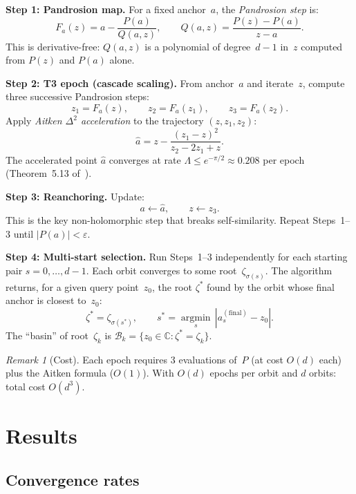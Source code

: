 \documentclass[11pt,a4paper]{article}
\theoremstyle{definition}
\theoremstyle{remark}
\newtheorem{remark}[theorem]{Remark}
\begin{document}
\medskip
\noindent\textbf{Step 1: Pandrosion map.}  For a fixed anchor~$a$, the \emph{Pandrosion step} is:
\[
  F_a(z) = a - \frac{P(a)}{Q(a, z)}, \qquad
  Q(a, z) = \frac{P(z) - P(a)}{z - a}.
\]
This is derivative-free: $Q(a, z)$ is a polynomial of degree~$d-1$ in~$z$ computed from $P(z)$ and $P(a)$ alone.

\medskip
\noindent\textbf{Step 2: T3 epoch (cascade scaling).}  From anchor~$a$ and iterate~$z$, compute three successive Pandrosion steps:
\[
  z_1 = F_a(z), \qquad z_2 = F_a(z_1), \qquad z_3 = F_a(z_2).
\]
Apply \emph{Aitken $\Delta^2$ acceleration} to the trajectory $(z, z_1, z_2)$:
\[
  \hat{a} = z - \frac{(z_1 - z)^2}{z_2 - 2z_1 + z}.
\]
The accelerated point $\hat{a}$ converges at rate $\Lambda \leq e^{-\pi/2} \approx 0.208$ per epoch (Theorem~5.13 of~\cite{Besevic2026g}).

\medskip
\noindent\textbf{Step 3: Reanchoring.}  Update:
\[
  a \leftarrow \hat{a}, \qquad z \leftarrow z_3.
\]
This is the key non-holomorphic step that breaks self-similarity.  Repeat Steps~1--3 until $|P(a)| < \varepsilon$.

\medskip
\noindent\textbf{Step 4: Multi-start selection.}  Run Steps~1--3 independently for each starting pair $s = 0, \ldots, d-1$.  Each orbit converges to some root~$\zeta_{\sigma(s)}$.  The algorithm returns, for a given query point~$z_0$, the root $\zeta^*$ found by the orbit whose final anchor is closest to~$z_0$:
\[
  \zeta^* = \zeta_{\sigma(s^*)}, \qquad
  s^* = \operatorname*{argmin}_{s}\, |a_s^{(\text{final})} - z_0|.
\]
The ``basin'' of root~$\zeta_k$ is $\mathcal{B}_k = \{z_0 \in \mathbb{C} : \zeta^* = \zeta_k\}$.

\begin{remark}[Cost]
Each epoch requires $3$ evaluations of~$P$ (at cost $O(d)$ each) plus the Aitken formula ($O(1)$).  With $O(d)$ epochs per orbit and $d$ orbits: total cost $O(d^3)$.
\end{remark}

\section{Results}
\label{sec:results}

\subsection{Convergence rates}
\end{document}
